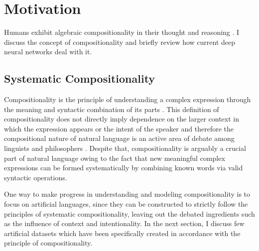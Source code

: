 \section{Motivation} \label{Chapter:motivation}
Humans exhibit algebraic compositionality in their thought and reasoning \citep{marcus2003algebraic}. I discuss the concept of compositionality and briefly review how current deep neural networks deal with it. 


\subsection{Systematic Compositionality} \label{systematic}
Compositionality is the principle of understanding a complex expression through the meaning and syntactic combination of its parts \citep{frege1968foundations}. This definition of compositionality does not directly imply dependence on the larger context in which the expression appears or the intent of the speaker and therefore the compositional nature of natural language is an active area of debate among linguists and philosophers \citep{sep-compositionality}. Despite that, compositionality is arguably a crucial part of natural language owing to the fact that new meaningful complex expressions can be formed systematically by combining known words via valid syntactic operations.


One way to make progress in understanding and modeling compositionality is to focus on artificial languages, since they can be constructed to strictly follow the principles of systematic compositionality, leaving out the debated ingredients such as the influence of context and intentionality. In the next section, I discuss few artificial datasets which have been specifically created in accordance with the principle of compositionality.

